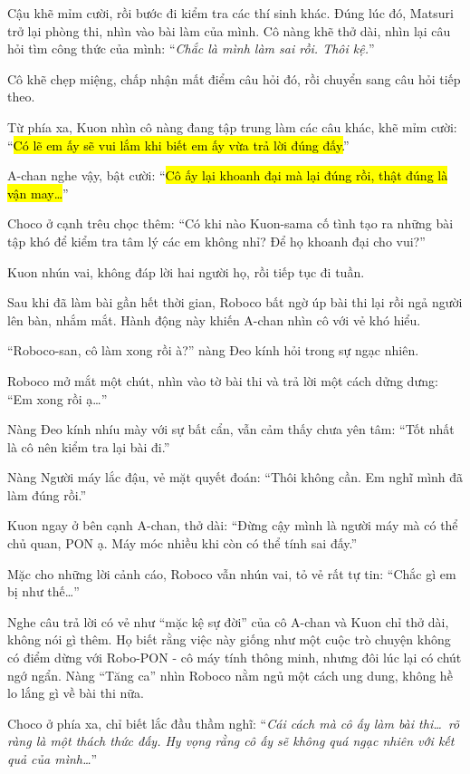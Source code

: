 \documentclass[../main.tex]{subfiles}
\begin{document}
Cậu khẽ mỉm cười, rồi bước đi kiểm tra các thí sinh khác. Đúng lúc đó, Matsuri trở lại phòng thi, nhìn vào bài làm của mình. Cô nàng khẽ thở dài, nhìn lại câu hỏi tìm công thức của mình: ``\textit{Chắc là mình làm sai rồi. Thôi kệ.}''

Cô khẽ chẹp miệng, chấp nhận mất điểm câu hỏi đó, rồi chuyển sang câu hỏi tiếp theo.

Từ phía xa, Kuon nhìn cô nàng đang tập trung làm các câu khác, khẽ mỉm cười: ``\hl {Có lẽ em ấy sẽ vui lắm khi biết em ấy vừa trả lời đúng đấy.}''

A-chan nghe vậy, bật cười: ``\hl{Cô ấy lại khoanh đại mà lại đúng rồi, thật đúng là vận may\dots}''

Choco ở cạnh trêu chọc thêm: ``Có khi nào Kuon-sama cố tình tạo ra những bài tập khó để kiểm tra tâm lý các em không nhỉ? Để họ khoanh đại cho vui?''

Kuon nhún vai, không đáp lời hai người họ, rồi tiếp tục đi tuần.

\ct

Sau khi đã làm bài gần hết thời gian, Roboco bất ngờ úp bài thi lại rồi ngả người lên bàn, nhắm mắt. Hành động này khiến A-chan nhìn cô với vẻ khó hiểu.

``Roboco-san, cô làm xong rồi à?'' nàng Đeo kính hỏi trong sự ngạc nhiên.

Roboco mở mắt một chút, nhìn vào tờ bài thi và trả lời một cách dửng dưng: ``Em xong rồi ạ\dots''

Nàng Đeo kính nhíu mày với sự bất cẩn, vẫn cảm thấy chưa yên tâm: ``Tốt nhất là cô nên kiểm tra lại bài đi.''

Nàng Người máy lắc đậu, vẻ mặt quyết đoán: ``Thôi không cần. Em nghĩ mình đã làm đúng rồi.''

Kuon ngay ở bên cạnh A-chan, thở dài: ``Đừng cậy mình là người máy mà có thể chủ quan, PON ạ. Máy móc nhiều khi còn có thể tính sai đấy.''

Mặc cho những lời cảnh cáo, Roboco vẫn nhún vai, tỏ vẻ rất tự tin: ``Chắc gì em bị như thế\dots''

Nghe câu trả lời có vẻ như ``mặc kệ sự đời'' của cô A-chan và Kuon chỉ thở dài, không nói gì thêm. Họ biết rằng việc này giống như một cuộc trò chuyện không có điểm dừng với Robo-PON - cô máy tính thông minh, nhưng đôi lúc lại có chút ngớ ngẩn. Nàng ``Tăng ca'' nhìn Roboco nằm ngủ một cách ung dung, không hề lo lắng gì về bài thi nữa.

Choco ở phía xa, chỉ biết lắc đầu thầm nghĩ: ``\textit{Cái cách mà cô ấy làm bài thi\dots\ rõ ràng là một thách thức đấy. Hy vọng rằng cô ấy sẽ không quá ngạc nhiên với kết quả của mình\dots}''
\end{document}
